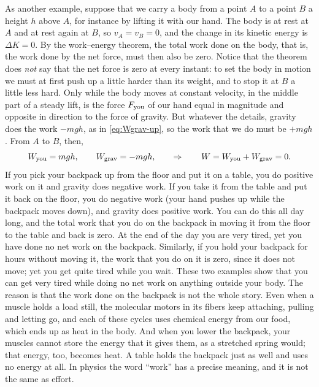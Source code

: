 \documentclass[11pt,a4paper]{article}
\begin{document}
As another example, suppose that we carry a body from a point $A$ to a point $B$ a height $h$ above
$A$, for instance by lifting it with our hand. The body is at rest at $A$ and at rest again at $B$, so
$v_A = v_B = 0$, and the change in its kinetic energy is $\Delta K = 0$. By the work--energy theorem,
the total work done on the body, that is, the work done by the net force, must then also be zero.
Notice that the theorem does \emph{not} say that the net force is zero at every instant: to set the
body in motion we must at first push up a little harder than its weight, and to stop it at $B$ a
little less hard. Only while the body moves at constant velocity, in the middle part of a steady
lift, is the force $F_{\mathrm{you}}$ of our hand equal in magnitude and opposite in direction to the force
of gravity. But whatever the details,
gravity does the work $-mgh$, as in \eqref{eq:Wgrav-up}, so the work that we do must be $+mgh$. From
$A$ to $B$, then,
\begin{equation}\label{eq:carry}
  W_{\mathrm{you}} = mgh , \qquad W_{\mathrm{grav}} = -mgh , \qquad\Rightarrow\qquad
  W = W_{\mathrm{you}} + W_{\mathrm{grav}} = 0 .
\end{equation}
If you pick your backpack up from the floor and put it on a table, you do positive work on it and
gravity does negative work. If you take it from the table and put it back on the floor, you do
negative work (your hand pushes up while the backpack moves down), and gravity does positive work.
You can do this all day long, and the total work that you do on the backpack in moving it from the
floor to the table and back is zero. At the end of the day you are very tired, yet you have done no
net work on the backpack. Similarly, if you hold your backpack for hours without moving it, the work
that you do on it is zero, since it does not move; yet you get quite tired while you wait. These two
examples show that you can get very tired while doing no net work on anything outside your body. The
reason is that the work done on the backpack is not the whole story. Even when a muscle holds a load
still, the molecular motors in its fibers keep attaching, pulling and letting go, and each of these
cycles uses chemical energy from our food, which ends up as heat in the body. And when you lower the
backpack, your muscles cannot store the energy that it gives them, as a stretched spring would; that
energy, too, becomes heat. A table holds the backpack just as well and uses no energy at all. In
physics the word ``work'' has a precise meaning, and it is not the same as effort.
\end{document}
